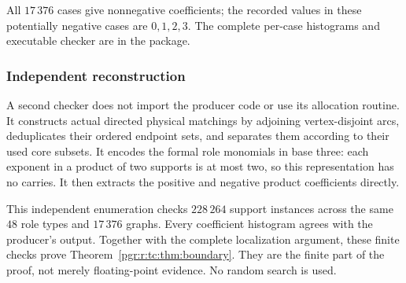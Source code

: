 \documentclass[11pt]{article}
\numberwithin{equation}{section}
\theoremstyle{definition}\newtheorem{definition}[theorem]{Definition}\newtheorem{remark}[theorem]{Remark}
\begin{document}
All $17\,376$ cases give nonnegative coefficients; the recorded values in
these potentially negative cases are $0,1,2,3$. The complete per-case
histograms and executable checker are in the package.

\subsubsection*{Independent reconstruction}
A second checker does not import the producer code or use its allocation
routine. It constructs actual directed physical matchings by adjoining
vertex-disjoint arcs, deduplicates their ordered endpoint sets, and separates
them according to their used core subsets. It encodes the formal role
monomials in base three: each exponent in a product of two supports is at most
two, so this representation has no carries. It then extracts the positive
and negative product coefficients directly.

This independent enumeration checks $228\,264$ support instances across the
same $48$ role types and $17\,376$ graphs. Every coefficient histogram agrees
with the producer's output. Together with the complete localization argument,
these finite checks prove Theorem~\ref{pgr:r:tc:thm:boundary}. They are the finite part
of the proof, not merely floating-point evidence. No random search is used.
\end{document}
